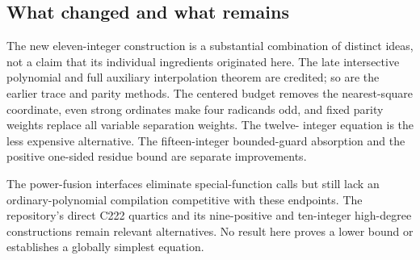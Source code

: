 \subsection{What changed and what remains}
The new eleven-integer construction is a substantial combination of distinct
ideas, not a claim that its individual ingredients originated here. The late
intersective polynomial and full auxiliary interpolation theorem are credited;
so are the earlier trace and parity methods. The centered budget removes the
nearest-square coordinate, even strong ordinates make four radicands odd,
and fixed parity weights replace all variable separation weights. The twelve-
integer equation is the less expensive alternative. The fifteen-integer
bounded-guard absorption and the positive one-sided residue bound are separate
improvements.

The power-fusion interfaces eliminate special-function calls but still lack
an ordinary-polynomial compilation competitive with these endpoints. The
repository's direct C222 quartics and its nine-positive and ten-integer
high-degree constructions remain relevant alternatives. No result here
proves a lower bound or establishes a globally simplest equation.
